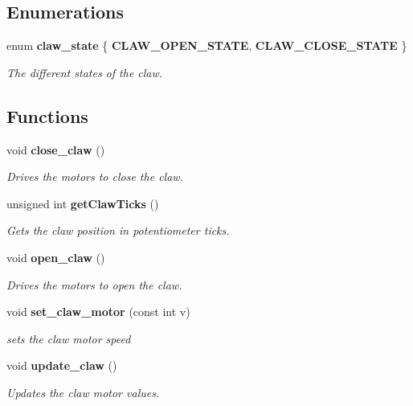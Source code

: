 \subsection*{Enumerations}
\begin{DoxyCompactItemize}
\item 
enum \textbf{ claw\+\_\+state} \{ \textbf{ C\+L\+A\+W\+\_\+\+O\+P\+E\+N\+\_\+\+S\+T\+A\+TE}, 
\textbf{ C\+L\+A\+W\+\_\+\+C\+L\+O\+S\+E\+\_\+\+S\+T\+A\+TE}
 \}\begin{DoxyCompactList}\small\item\em The different states of the claw. \end{DoxyCompactList}
\end{DoxyCompactItemize}
\subsection*{Functions}
\begin{DoxyCompactItemize}
\item 
void \textbf{ close\+\_\+claw} ()
\begin{DoxyCompactList}\small\item\em Drives the motors to close the claw. \end{DoxyCompactList}\item 
unsigned int \textbf{ get\+Claw\+Ticks} ()
\begin{DoxyCompactList}\small\item\em Gets the claw position in potentiometer ticks. \end{DoxyCompactList}\item 
void \textbf{ open\+\_\+claw} ()
\begin{DoxyCompactList}\small\item\em Drives the motors to open the claw. \end{DoxyCompactList}\item 
void \textbf{ set\+\_\+claw\+\_\+motor} (const int v)
\begin{DoxyCompactList}\small\item\em sets the claw motor speed \end{DoxyCompactList}\item 
void \textbf{ update\+\_\+claw} ()
\begin{DoxyCompactList}\small\item\em Updates the claw motor values. \end{DoxyCompactList}\end{DoxyCompactItemize}


